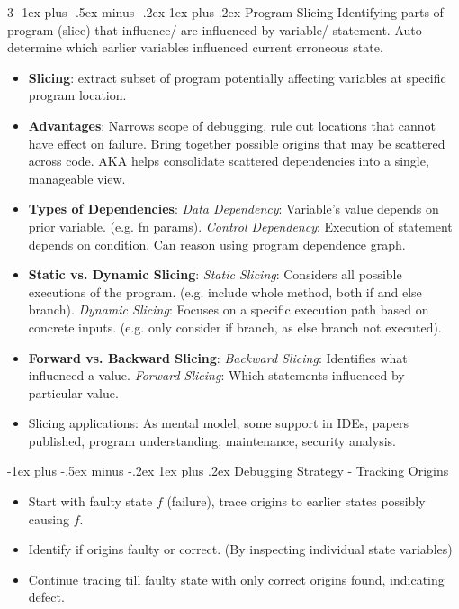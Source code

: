 \documentclass[a4paper, 10pt, landscape]{article}
\makeatletter
\renewcommand{\subsubsection}{\@startsection{subsubsection}{3}{0mm}%
                                {-1ex plus -.5ex minus -.2ex}%
                                {1ex plus .2ex}%
                                {\normalfont\small\bfseries}}
\makeatother
\begin{document}
\begin{multicols*}{3}
\subsubsection{Program Slicing}
Identifying parts of program (slice) that influence/ are influenced by variable/ statement. Auto determine which earlier variables influenced current erroneous state.
\begin{itemize}[itemsep=-1pt]
\item \textbf{Slicing}: extract subset of program potentially affecting variables at specific program location.
\item \textbf{Advantages}: Narrows scope of debugging, rule out locations that cannot have effect on failure. Bring together possible origins that may be scattered across code. AKA helps consolidate scattered dependencies into a single, manageable view.
\item \textbf{Types of Dependencies}: \textit{Data Dependency}: Variable's value depends on prior variable. (e.g. fn params). \textit{Control Dependency}: Execution of statement depends on condition. Can reason using program dependence graph.
\item \textbf{Static vs. Dynamic Slicing}: \textit{Static Slicing}: Considers all possible executions of the program. (e.g. include whole method, both if and else branch). \textit{Dynamic Slicing}: Focuses on a specific execution path based on concrete inputs. (e.g. only consider if branch, as else branch not executed).
\item \textbf{Forward vs. Backward Slicing}: \textit{Backward Slicing}: Identifies what influenced a value. \textit{Forward Slicing}: Which statements influenced by particular value.
\item Slicing applications: As mental model, some support in IDEs, papers published, program understanding, maintenance, security analysis.
\end{itemize}

\subsubsection{Debugging Strategy - Tracking Origins}
\begin{itemize}
\item Start with faulty state $f$ (failure), trace origins to earlier states possibly causing $f$.
\item Identify if origins faulty or correct. (By inspecting individual state variables)
\item Continue tracing till faulty state with only correct origins found, indicating defect.
\end{itemize}
 



\end{multicols*}
\end{document}
